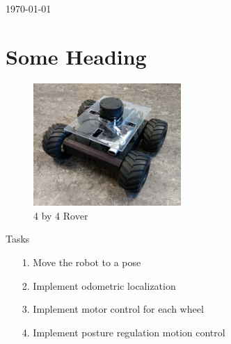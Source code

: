 \documentclass[a4paper,10pt]{article}
\begin{document}
\begin{titlepage}
	
	
	\vfill\vfill\vfill %
	
	{\large\today} %
	
	
	 
	
	\vfill %
	
\end{titlepage}



\renewcommand{\labelenumi}{\alph{enumi})}


\section*{Some Heading}

\begin{figure}[H]
\centering
 \includegraphics[width=0.5\textwidth]{rover_pic.png}
 \caption{4 by 4 Rover}
 \label{fig:1}
\end{figure}


Tasks

\begin{itemize}
	\item[1.]Move the robot to a pose
	\item[2.]Implement odometric localization
	\item[3.]Implement motor control for each wheel
	\item[4.]Implement posture regulation motion control	
\end{itemize}
\end{document}
